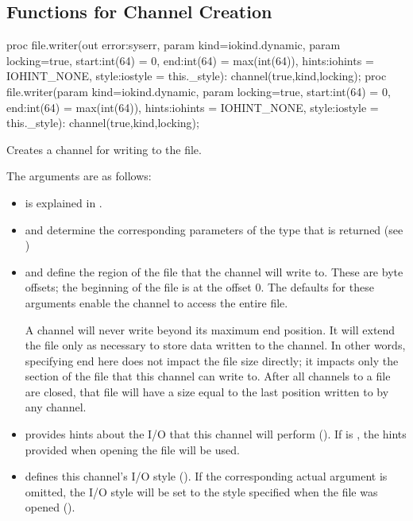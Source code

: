 \subsection{Functions for Channel Creation}
\label{IO_channel_creation}

\begin{protohead}
proc file.writer(out error:syserr, param kind=iokind.dynamic, param locking=true,
                 start:int(64) = 0, end:int(64) = max(int(64)),
                 hints:iohints = IOHINT_NONE,
                 style:iostyle = this._style): channel(true,kind,locking);
proc file.writer(param kind=iokind.dynamic, param locking=true,
                 start:int(64) = 0, end:int(64) = max(int(64)),
                 hints:iohints = IOHINT_NONE,
                 style:iostyle = this._style): channel(true,kind,locking);
\end{protohead}
\begin{protobody}
Creates a channel for writing to the file.

The arguments are as follows:

\begin{itemize}

\item {} is explained in .

\item {} and  determine the corresponding parameters of
      the  type that is returned (see )

\item {} and  define the region of the file that
      the channel will write to. 
      These are byte offsets; the beginning of the file is at the offset 0.
      The defaults for these arguments enable
      the channel to access the entire file.

      A channel will never write beyond its maximum end position.
      It will extend the file only as necessary to store data
      written to the channel. In other words, specifying end here
      does not impact the file size directly; it impacts only the section of the file
      that this channel can write to. After all channels to a file
      are closed, that file will have a size equal to the last
      position written to by any channel.

\item {} provides hints about the I/O that this channel
      will perform ().
      If  is , the hints provided when opening
      the file will be used.

\item {} defines this channel's I/O style ().
      If the corresponding actual argument is omitted,
      the I/O style will be set to the style specified when the file
      was opened ().

\end{itemize}
\end{protobody}

